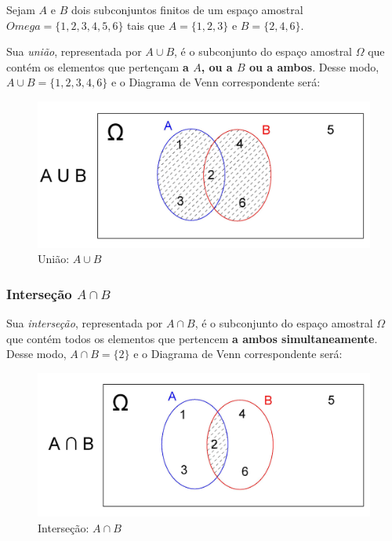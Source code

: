 \documentclass[
]{book}
\begin{document}
Sejam \(A\) e \(B\) dois subconjuntos finitos de um espaço amostral \(Omega=\{1,2,3,4,5,6\}\) tais que \(A=\{1,2,3\}\) e \(B=\{2,4,6\}\).

\hfill\break

Sua \emph{união}, representada por \(A \cup B\), é o subconjunto do espaço amostral \(\Omega\) que contém os elementos que pertençam \textbf{a \(A\), ou a \(B\) ou a ambos}. Desse modo, \(A \cup B =\{1,2,3,4,6\}\) e o Diagrama de Venn correspondente será:

\hfill\break

\begin{figure}

{\centering \includegraphics[width=0.8\linewidth]{images4/A_UN_B} 

}

\caption{União: $A \cup B$}\label{fig:unnamed-chunk-52}
\end{figure}

\hfill\break

\hypertarget{interseuxe7uxe3o-a-cap-b}{%
\subsubsection{\texorpdfstring{Interseção \(A \cap B\)}{Interseção A \textbackslash cap B}}\label{interseuxe7uxe3o-a-cap-b}}

Sua \emph{interseção}, representada por \(A \cap B\), é o subconjunto do espaço amostral \(\Omega\) que contém todos os elementos que pertencem \textbf{a ambos simultaneamente}. Desse modo, \(A \cap B =\{2\}\) e o Diagrama de Venn correspondente será:

\hfill\break

\begin{figure}

{\centering \includegraphics[width=0.8\linewidth]{images4/A_INTER_B} 

}

\caption{Interseção: $A \cap B$}\label{fig:unnamed-chunk-53}
\end{figure}
\end{document}
